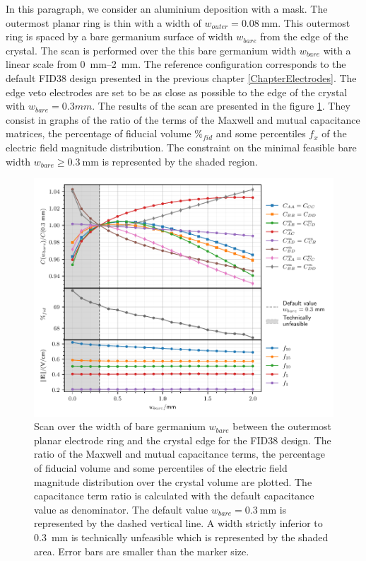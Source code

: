 In this paragraph, we consider an aluminium deposition with a mask. The outermost planar ring is thin with a width of $w_{outer}=\SI{0.08}{\mm}$. This outermost ring is spaced by a bare germanium surface of width $w_{bare}$ from the edge of the crystal. The scan is performed over the this bare germanium width $w_{bare}$ with a linear scale from \SIrange{0}{2}{\mm}. The reference configuration corresponds to the default FID38 design presented in the previous chapter \ref{ChapterElectrodes}. The edge veto electrodes are set to be as close as possible to the edge of the crystal with $w_{bare}=0.3mm$.
The results of the scan are presented in the figure \ref{fig:capacitance-fiducial-dead-edge}. They consist in graphs of the ratio of the terms of the Maxwell and mutual capacitance matrices, the percentage of fiducial volume $\%_{fid}$ and some percentiles $f_x$ of the electric field magnitude distribution. The constraint on the minimal feasible bare width $w_{bare} \geq \SI{0.3}{\mm}$ is represented by the shaded region.
  
\begin{figure}
\centering
\includegraphics[scale=1]{Figures/ElectrodesScan/capacitance_fiducial_dead_edge.pdf}
\caption{Scan over the width of bare germanium $w_{bare}$ between the outermost planar electrode ring and the crystal edge for the FID38 design. The ratio of the Maxwell and mutual capacitance terms, the percentage of fiducial volume and some percentiles of the electric field magnitude distribution over the crystal volume are plotted. The capacitance term ratio is calculated with the default capacitance value as denominator. The default value $w_{bare}=\SI{0.3}{\mm}$ is represented by the dashed vertical line. A width strictly inferior to \SI{0.3}{\mm} is technically unfeasible which is represented by the shaded area. Error bars are smaller than the marker size.}
\label{fig:capacitance-fiducial-dead-edge}
\end{figure}

